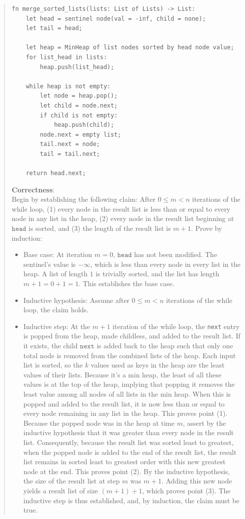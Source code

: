 \documentclass[11pt]{article}
\newcommand{\code}[1]{$\texttt{#1}$}
\begin{document}
\begin{enumerate}
\begin{enumerate}
\begin{quote}
  \begin{verbatim}
fn merge_sorted_lists(lists: List of Lists) -> List:
    let head = sentinel node(val = -inf, child = none);
    let tail = head;
    
    let heap = MinHeap of list nodes sorted by head node value;
    for list_head in lists:
        heap.push(list_head);
    
    while heap is not empty:
        let node = heap.pop();
        let child = node.next;
        if child is not empty:
            heap.push(child);
        node.next = empty list;
        tail.next = node;
        tail = tail.next;

    return head.next;
  \end{verbatim}

  \textbf{Correctness}: \\ 
  Begin by establishing the following claim: After $0 \leq m < n$ iterations of the while loop, (1) every node in the result list is less than or equal to every node in any list in the heap, (2) every node in the result list beginning at \code{head} is sorted, and (3) the length of the result list is $m + 1$. Prove by induction:
  \begin{itemize}
    \item Base case: At iteration $m = 0$, \code{head} has not been modified. The sentinel's value is $-\infty$, which is less than every node in every list in the heap. A list of length $1$ is trivially sorted, and the list has length $m + 1 = 0 + 1 = 1$. This establishes the base case.
    \item Inductive hypothesis: Assume after $0 \leq m < n$ iterations of the while loop, the claim holds. 
    \item Inductive step: At the $m + 1$ iteration of the while loop, the \texttt{next} entry is popped from the heap, made childless, and added to the result list. If it exists, the child \code{next} is added back to the heap such that only one total node is removed from the combined lists of the heap. Each input list is sorted, so the $k$ values used as keys in the heap are the least values of their lists. Because it's a min heap, the least of all these values is at the top of the heap, implying that popping it removes the least value among all nodes of all lists in the min heap. When this is popped and added to the result list, it is now less than or equal to every node remaining in any list in the heap. This proves point (1). Because the popped node was in the heap at time $m$, assert by the inductive hypothesis that it was greater than every node in the result list. Consequently, because the result list was sorted least to greatest, when the popped node is added to the end of the result list, the result list remains in sorted least to greatest order with this new greatest node at the end. This proves point (2). By the inductive hypothesis, the size of the result list at step $m$ was $m + 1$. Adding this new node yields a result list of size $(m + 1) + 1$, which proves point (3). The inductive step is thus established, and, by induction, the claim must be true. 
  \end{itemize}


\end{quote}
\end{enumerate}
\end{enumerate}
\end{document}
